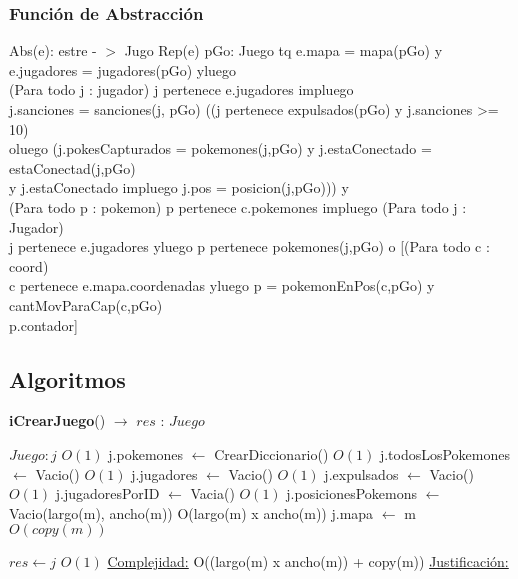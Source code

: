 \begin{Representacion}
\begin{enumerate}
	\end{enumerate}
	
\subsubsection{Funci\'on de Abstracci\'on}	
	Abs(e): estre - $>$ Jugo {Rep(e)} 
 pGo: Juego tq e.mapa = mapa(pGo) y e.jugadores = jugadores(pGo) yluego \\
 (Para todo j : jugador) j pertenece e.jugadores impluego 
 \\ j.sanciones = sanciones(j, pGo) ((j pertenece expulsados(pGo) y j.sanciones >= 10)\\
 oluego (j.pokesCapturados = pokemones(j,pGo) y j.estaConectado = estaConectad(j,pGo) \\
 y j.estaConectado impluego j.pos = posicion(j,pGo))) y \\
 (Para todo p : pokemon) p pertenece c.pokemones impluego (Para todo j : Jugador) \\
 j pertenece e.jugadores yluego p pertenece pokemones(j,pGo) o [(Para todo c : coord)\\
 c pertenece e.mapa.coordenadas yluego p = pokemonEnPos(c,pGo) y cantMovParaCap(c,pGo)\\
 p.contador]
\end{Representacion}


\subsection{Algoritmos}

\begin{algorithm}[H]{\textbf{iCrearJuego}() $\to$ $res$ : $Juego$}
	\begin{algorithmic}
		\State $Juego : j$	\Comment $O(1)$
		\State j.pokemones $\gets$ CrearDiccionario()	\Comment $O(1)$
		\State j.todosLosPokemones $\gets$ Vacio()	\Comment $O(1)$
		\State j.jugadores $\gets$ Vacio()	\Comment $O(1)$
		\State j.expulsados $\gets$ Vacio()	\Comment $O(1)$
		\State j.jugadoresPorID $\gets$ Vacia()	\Comment $O(1)$
		\State j.posicionesPokemons $\gets$	Vacio(largo(m), ancho(m))	\Comment O(largo(m) x ancho(m))
		\State j.mapa $\gets$ m	\Comment $O(copy(m))$

		\State $res \gets j$ \Comment $O(1)$
		\medskip
		\Statex \underline{Complejidad:} O((largo(m) x ancho(m)) + copy(m))
		\Statex \underline{Justificación:} 

    \end{algorithmic}
\end{algorithm}

